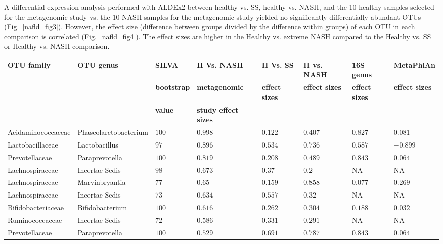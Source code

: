 A differential expression analysis performed with ALDEx2 between healthy vs. SS, healthy vs. NASH, and the 10 healthy samples selected for the metagenomic study vs. the 10 NASH samples for the metagenomic study yielded no significantly differentially abundant OTUs (Fig.~\ref{nafld_fig3}). However, the effect size (difference between groups divided by the difference within groups) of each OTU in each comparison is correlated (Fig.~\ref{nafld_fig4}). The effect sizes are higher in the Healthy vs. extreme NASH compared to the Healthy vs. SS or Healthy vs. NASH comparison.

\begin{table}[!ht]
\begin{tiny}
\begin{tabular}{|l|l|l|l|l|l|l|l|}
\hline
\bf{OTU family} & \bf{OTU genus} & \bf{SILVA} &\bf{H Vs. NASH} & \bf{H Vs. SS} & \bf{H vs. NASH} & \bf{16S genus} & \bf{MetaPhlAn}\\
& & \bf{bootstrap} & \bf{metagenomic} & \bf{effect sizes} & \bf{effect sizes} & \bf{effect sizes} & \bf{effect sizes}\\
& & \bf{value} & \bf{study effect sizes} & & & & \\ \hline
Acidaminococcaceae & Phascolarctobacterium & $100$ & $0.998$ & $0.122$ & $0.407$ & $0.827$ & $0.081$ \\ \hline
Lactobacillaceae & Lactobacillus & $97$ & $0.896$ & $0.534$ & $0.736$ & $0.587$ & $-0.899$ \\ \hline
Prevotellaceae & Paraprevotella & $100$ & $0.819$ & $0.208$ & $0.489$ & $0.843$ & $0.064$ \\ \hline
Lachnospiraceae & Incertae Sedis & $98$ & $0.673$ & $0.37$ & $0.2$ & NA & NA \\ \hline
Lachnospiraceae & Marvinbryantia & $77$ & $0.65$ & $0.159$ & $0.858$ & $0.077$ & $0.269$ \\ \hline
Lachnospiraceae & Incertae Sedis & $73$ & $0.634$ & $0.557$ & $0.32$ & NA & NA \\ \hline
Bifidobacteriaceae & Bifidobacterium & $100$ & $0.616$ & $0.262$ & $0.304$ & $0.188$ & $0.032$ \\ \hline
Ruminococcaceae & Incertae Sedis & $72$ & $0.586$ & $0.331$ & $0.291$ & NA & NA \\ \hline
Prevotellaceae & Paraprevotella & $100$ & $0.529$ & $0.691$ & $0.787$ & $0.843$ & $0.064$ \\ \hline

\end{tabular}
\end{tiny}
\end{table}
